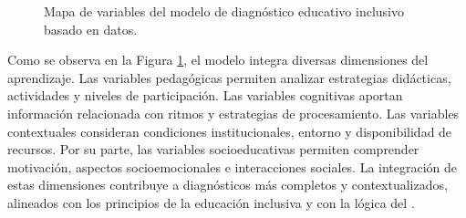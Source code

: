 \begin{refsection}
\begin{figure}[htbp]
{
}
\caption{Mapa de variables del modelo de diagnóstico educativo inclusivo basado en datos.}
\label{fig:variables-diagnostico}
\end{figure}

Como se observa en la Figura \ref{fig:variables-diagnostico}, el modelo integra diversas dimensiones del aprendizaje. Las variables pedagógicas permiten analizar estrategias didácticas, actividades y niveles de participación. Las variables cognitivas aportan información relacionada con ritmos y estrategias de procesamiento. Las variables contextuales consideran condiciones institucionales, entorno y disponibilidad de recursos. Por su parte, las variables socioeducativas permiten comprender motivación, aspectos socioemocionales e interacciones sociales. La integración de estas dimensiones contribuye a diagnósticos más completos y contextualizados, alineados con los principios de la educación inclusiva y con la lógica del \DUA.


\end{refsection}
